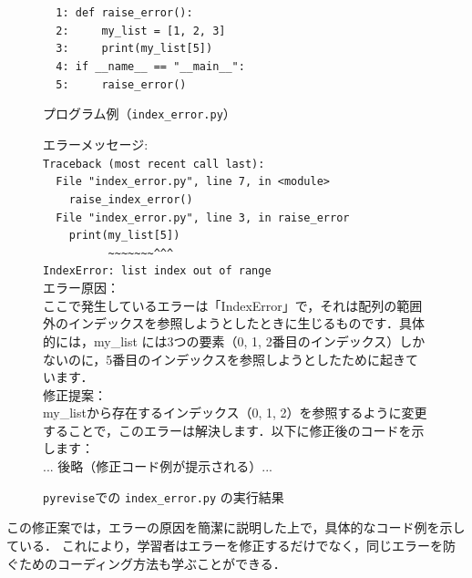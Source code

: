 \documentclass[12pt,twoside]{jbook}
\newcommand{\pyrevise}{\texttt{pyrevise}}
\begin{document}
\begin{figure}[t]
  {\footnotesize
  \begin{boxedminipage}{1.02\columnwidth}
\verb!  1: def raise_error():!\\
\verb!  2:     my_list = [1, 2, 3]!\\
\verb!  3:     print(my_list[5])!\\
\verb!  4: if __name__ == "__main__":!\\
\verb!  5:     raise_error()!
\end{boxedminipage}}
  \caption{プログラム例（\texttt{index\_error.py}）}\label{fig:program}
  \vspace{0.2cm}
  {\footnotesize
  \begin{boxedminipage}{1.02\columnwidth}
エラーメッセージ:\\
\verb!Traceback (most recent call last):!\\
\verb!  File "index_error.py", line 7, in <module>!\\
\verb!    raise_index_error()!\\
\verb!  File "index_error.py", line 3, in raise_error!\\
\verb!    print(my_list[5])!\\
\verb!          ~~~~~~~^^^!\\
\verb!IndexError: list index out of range!\\
エラー原因：\\
ここで発生しているエラーは「IndexError」で，それは配列の範囲外のインデックスを参照しようとしたときに生じるものです．具体的には，my\_list には3つの要素（0, 1, 2番目のインデックス）しかないのに，5番目のインデックスを参照しようとしたために起きています．\\
修正提案：\\
my\_listから存在するインデックス（0, 1, 2）を参照するように変更することで，このエラーは解決します．以下に修正後のコードを示します：\\
... 後略（修正コード例が提示される）...



  \end{boxedminipage}}
  \caption{\pyrevise での \texttt{index\_error.py} の実行結果}\label{fig:result}
\end{figure}
この修正案では，エラーの原因を簡潔に説明した上で，具体的なコード例を示している．
これにより，学習者はエラーを修正するだけでなく，同じエラーを防ぐためのコーディング方法も学ぶことができる．
\end{document}
